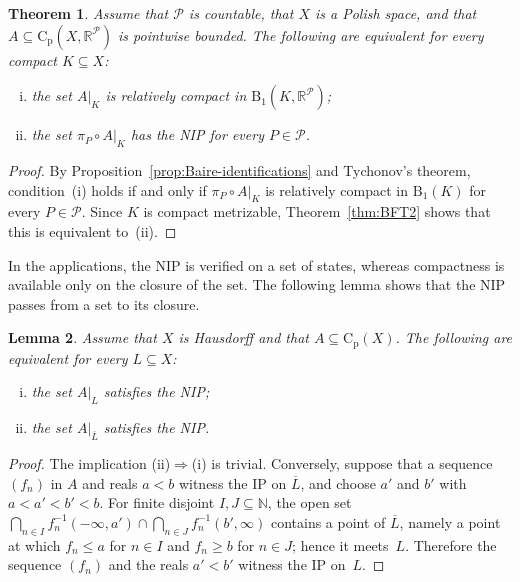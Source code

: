 \documentclass[psamsfonts]{amsart}
\newtheorem{thm}{Theorem}[section]
\newtheorem{lem}[thm]{Lemma}
\theoremstyle{definition}
\theoremstyle{remark}
\newcommand{\Cp}{\mathrm{C}_{\mathrm{p}}}
\numberwithin{equation}{section}
\begin{document}
\begin{thm}\label{thm:Generalized-BFT}
  Assume that $\mathcal{P}$ is countable, that $X$ is a Polish space, and that $A\subseteq\Cp(X,\mathbb{R}^\mathcal{P})$ is pointwise bounded.
  The following are equivalent for every compact $K\subseteq X$:
  \begin{enumerate}[(i)]
  \item
    the set $A|_K$ is relatively compact in $\mathrm{B}_1(K,\mathbb{R}^\mathcal{P})$;
  \item
    the set $\pi_P\circ A|_K$ has the NIP for every $P\in\mathcal{P}$.
  \end{enumerate}
\end{thm}
\begin{proof}
  By Proposition~\ref{prop:Baire-identifications} and Tychonov’s theorem, condition~(i) holds if and only if $\pi_P\circ A|_K$ is relatively compact in $\mathrm{B}_1(K)$ for every $P\in\mathcal{P}$.
  Since $K$ is compact metrizable, Theorem~\ref{thm:BFT2} shows that this is equivalent to~(ii).
\end{proof}

In the applications, the NIP is verified on a set of states, whereas compactness is available only on the closure of the set.
The following lemma shows that the NIP passes from a set to its closure.

\begin{lem}\label{lem:NIP-and-closure}
  Assume that $X$ is Hausdorff and that $A\subseteq \Cp(X)$.
  The following are equivalent for every $L\subseteq X$:
  \begin{enumerate}[(i)]
  \item
    the set $A|_L$ satisfies the NIP;
  \item
    the set $A|_{\overline{L}}$ satisfies the NIP.
  \end{enumerate}
\end{lem}
\begin{proof}
  The implication (ii)$\Rightarrow$(i) is trivial.
  Conversely, suppose that a sequence $(f_n)$ in $A$ and reals $a<b$ witness the IP on $\overline{L}$, and choose $a'$ and $b'$ with $a<a'<b'<b$.
  For finite disjoint $I,J\subseteq\mathbb{N}$, the open set $\bigcap_{n\in I}f_n^{-1}(-\infty,a')\cap\bigcap_{n\in J}f_n^{-1}(b',\infty)$ contains a point of $\overline{L}$, namely a point at which $f_n\le a$ for $n\in I$ and $f_n\ge b$ for $n\in J$;
  hence it meets~$L$.
  Therefore the sequence $(f_n)$ and the reals $a'<b'$ witness the IP on~$L$.
\end{proof}
\end{document}
